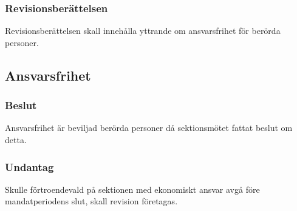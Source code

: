 \subsubsection{Revisionsberättelsen}
Revisionsberättelsen skall innehålla yttrande om ansvarsfrihet för berörda personer.

\subsection{Ansvarsfrihet}

\subsubsection{Beslut}
Ansvarsfrihet är beviljad berörda personer då sektionsmötet fattat beslut om detta.

\subsubsection{Undantag}
Skulle förtroendevald på sektionen med ekonomiskt ansvar avgå före mandatperiodens slut, skall revision företagas.